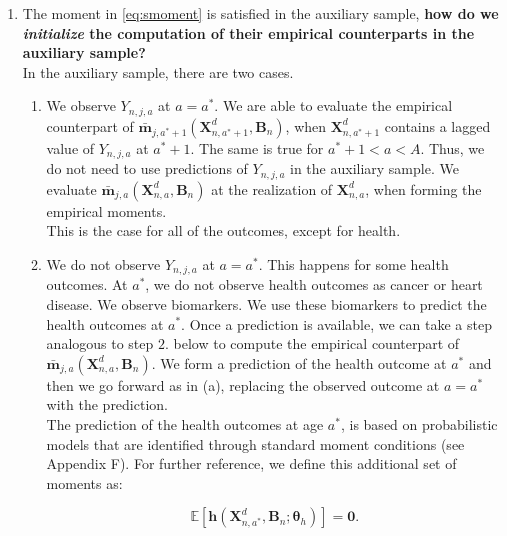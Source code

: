 \begin{enumerate}
\item The moment in \eqref{eq:smoment} is satisfied in the auxiliary sample, \textbf{how do we \textit{initialize} the computation of their empirical counterparts in the auxiliary sample?} \\ 
\noindent In the auxiliary sample, there are two cases.\\

\begin{enumerate}
\item We observe $Y_{n,j,a}$ at $a = a^*$. We are able to evaluate the empirical counterpart of $\bm{\bar{m}}_{j,a^*+1} \left( \bm{X}_{n,a^*+1}^d, \bm{B}_{n} \right) $, when $ \bm{X}_{n,a^*+1}^d$ contains a lagged value of $Y_{n,j,a}$ at $a^*+1$. The same is true for $a^*+1 < a < A$. Thus, we do not need to use predictions of $Y_{n,j,a}$ in the auxiliary sample. We evaluate $\bm{\bar{m}}_{j,a} \left( \bm{X}_{n,a}^d, \bm{B}_{n} \right)$ at  the realization of $\bm{X}_{n,a}^d$, when forming the empirical moments.\\

\noindent This is the case for all of the outcomes, except for health.\\

\item We do not observe $Y_{n,j,a}$ at $a = a^*$. This happens for some health outcomes. At $a^*$, we do not observe health outcomes as cancer or heart disease. We observe biomarkers.  We use these biomarkers to predict the health outcomes at $a^*$. Once a prediction is available, we can take a step analogous to step $2.$ below to compute the empirical counterpart of $\bm{\bar{m}}_{j,a} \left( \bm{X}_{n,a}^d, \bm{B}_{n} \right)$. We form a prediction of the health outcome at $a^*$ and then we go forward as in (a), replacing the observed outcome at $a = a^*$ with the prediction.\\

\noindent The prediction of the health outcomes at age $a^*$, is based on probabilistic models that are identified through standard moment conditions (see Appendix F). For further reference, we define this additional set of moments as: 

\begin{equation}
\mathbb{E} \left[ \mathbf{h} \left(  \bm{X}_{n,a^*}^d, \bm{B}_{n}; \bm{\theta}_{h}  \right) \right] = \mathbf{0}.
\end{equation}
\end{enumerate}


\end{enumerate}
